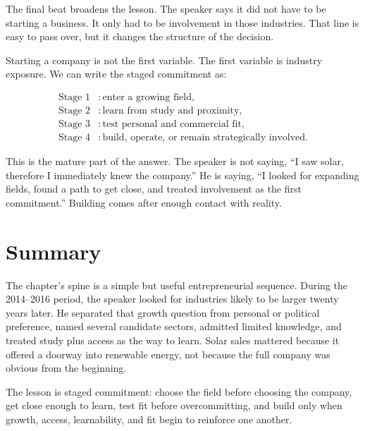 The final beat broadens the lesson. The speaker says it did not have to be starting a business. It only had to be involvement in those industries. That line is easy to pass over, but it changes the structure of the decision.

Starting a company is not the first variable. The first variable is industry exposure. We can write the staged commitment as:

\begin{align}
\text{Stage 1} &: \text{enter a growing field},\\
\text{Stage 2} &: \text{learn from study and proximity},\\
\text{Stage 3} &: \text{test personal and commercial fit},\\
\text{Stage 4} &: \text{build, operate, or remain strategically involved}.
\end{align}

This is the mature part of the answer. The speaker is not saying, ``I saw solar, therefore I immediately knew the company.'' He is saying, ``I looked for expanding fields, found a path to get close, and treated involvement as the first commitment.'' Building comes after enough contact with reality.

\section{Summary}

The chapter's spine is a simple but useful entrepreneurial sequence. During the 2014--2016 period, the speaker looked for industries likely to be larger twenty years later. He separated that growth question from personal or political preference, named several candidate sectors, admitted limited knowledge, and treated study plus access as the way to learn. Solar sales mattered because it offered a doorway into renewable energy, not because the full company was obvious from the beginning.

The lesson is staged commitment: choose the field before choosing the company, get close enough to learn, test fit before overcommitting, and build only when growth, access, learnability, and fit begin to reinforce one another.